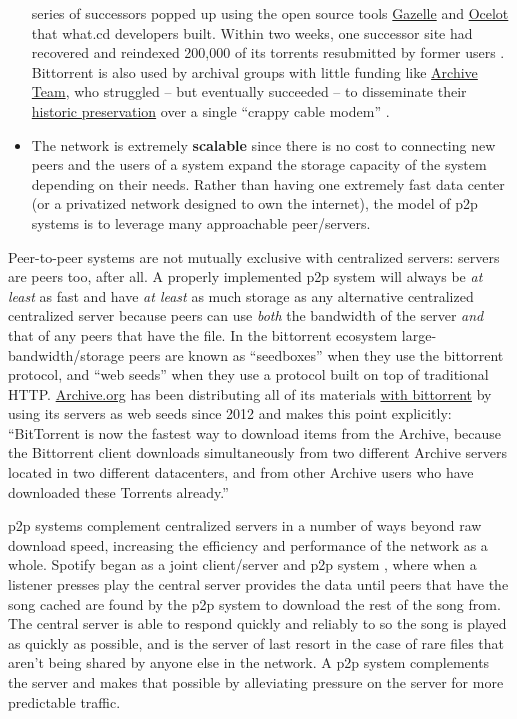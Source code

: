 \documentclass[10pt]{article}
\begin{document}
\begin{multicols}{2}
\begin{itemize}
  series of successors popped up using the open source tools
  \href{https://github.com/WhatCD/Gazelle}{Gazelle} and
  \href{https://github.com/WhatCD/Ocelot}{Ocelot} that what.cd
  developers built. Within two weeks, one successor site had recovered
  and reindexed 200,000 of its torrents resubmitted by former users \cite{vandersarWhatCdDead2016} . Bittorrent is also used by archival
  groups with little funding like
  \href{https://wiki.archiveteam.org/index.php/Main_Page}{Archive Team},
  who struggled -- but eventually succeeded -- to disseminate their
  \href{https://wiki.archiveteam.org/index.php/GeoCities_Project}{historic
  preservation} over a single ``crappy cable modem'' \cite{scottGeocitiesTorrentUpdate2010} .
\item
  The network is extremely \textbf{scalable} since there is no cost to
  connecting new peers and the users of a system expand the storage
  capacity of the system depending on their needs. Rather than having
  one extremely fast data center (or a privatized network designed to
  own the internet), the model of p2p systems is to leverage many
  approachable peer/servers.
\end{itemize}

Peer-to-peer systems are not mutually exclusive with centralized
servers: servers are peers too, after all. A properly implemented p2p
system will always be \emph{at least} as fast and have \emph{at least}
as much storage as any alternative centralized centralized server
because peers can use \emph{both} the bandwidth of the server \emph{and}
that of any peers that have the file. In the bittorrent ecosystem
large-bandwidth/storage peers are known as ``seedboxes''\cite{rossiPeekingBitTorrentSeedbox2014}  when they use the bittorrent
protocol, and ``web seeds''\cite{hoffmanHTTPBasedSeedingSpecification}  when they use a protocol built
on top of traditional HTTP. \href{https://archive.org}{Archive.org} has
been distributing all of its materials
\href{https://archive.org/details/bittorrent}{with bittorrent} by using
its servers as web seeds since 2012 and makes this point explicitly:
``BitTorrent is now the fastest way to download items from the Archive,
because the Bittorrent client downloads simultaneously from two
different Archive servers located in two different datacenters, and from
other Archive users who have downloaded these Torrents already.'' \cite{kahle000000Torrents2012} 

p2p systems complement centralized servers in a number of ways beyond
raw download speed, increasing the efficiency and performance of the
network as a whole. Spotify began as a joint client/server and p2p
system \cite{kreitzSpotifyLargeScale2010b} , where when a
listener presses play the central server provides the data until peers
that have the song cached are found by the p2p system to download the
rest of the song from. The central server is able to respond quickly and
reliably to so the song is played as quickly as possible, and is the
server of last resort in the case of rare files that aren't being shared
by anyone else in the network. A p2p system complements the server and
makes that possible by alleviating pressure on the server for more
predictable traffic.


\end{multicols}
\end{document}
